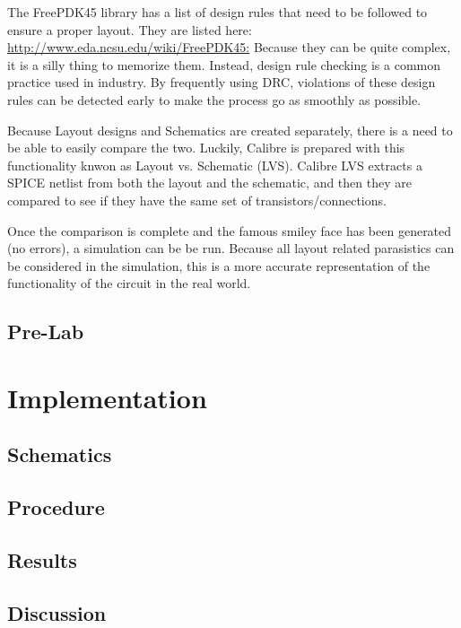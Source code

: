 \documentclass[12pt]{article}
\begin{document}
The FreePDK45 library has a list of design rules that need to be followed to ensure a proper layout. They are listed here: \url{http://www.eda.ncsu.edu/wiki/FreePDK45:} Because they can be quite complex, it is a silly thing to memorize them. Instead, design rule checking is a common practice used in industry. By frequently using DRC, violations of these design rules can be detected early to make the process go as smoothly as possible.

Because Layout designs and Schematics are created separately, there is a need to be able to easily compare the two. Luckily, Calibre is prepared with this functionality knwon as Layout vs. Schematic (LVS). Calibre LVS extracts a SPICE netlist from both the layout and the schematic, and then they are compared to see if they have the same set of transistors/connections.

Once the comparison is complete and the famous smiley face has been generated (no errors), a simulation can be be run. Because all layout related parasistics can be considered in the simulation, this is a more accurate representation of the functionality of the circuit in the real world. 
\subsection{Pre-Lab}

\section{Implementation}
\subsection{Schematics}
\subsection{Procedure}

\subsection{Results}


\subsection{Discussion}
\end{document}
